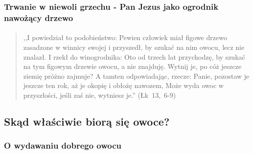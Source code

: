 \documentclass[10pt,a4paper,oneside]{article}
\begin{document}
\subsubsection{Trwanie w niewoli grzechu - Pan Jezus jako ogrodnik nawożący drzewo}
\paragraph{}
\begin{quote}
,,I powiedział to podobieństwo: Pewien człowiek miał figowe drzewo zasadzone w winnicy swojej i przyszedł, by szukać na nim owocu, lecz nie znalazł. I rzekł do winogrodnika: Oto od trzech lat przychodzę, by szukać na tym figowym drzewie owocu, a nie znajduję. Wytnij je, po cóż jeszcze ziemię próżno zajmuje? A tamten odpowiadając, rzecze: Panie, pozostaw je jeszcze ten rok, aż je okopię i obłożę nawozem, Może wyda owoc w przyszłości, jeśli zaś nie, wytniesz je.'' \mbox{(Łk 13, 6-9)}
\end{quote}
\subsection{Skąd właściwie biorą się owoce?}
\subsubsection{O wydawaniu dobrego owocu}
\end{document}
